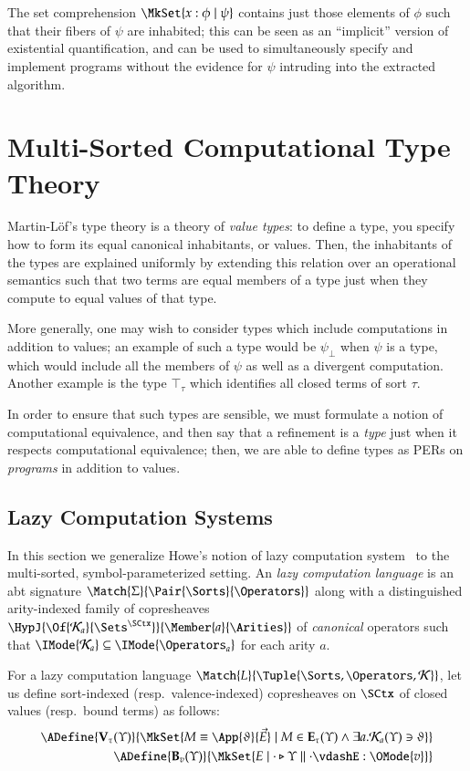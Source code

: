 \documentclass[11pt]{article}
\theoremstyle{definition}
\theoremstyle{notation}
\theoremstyle{remark}
\numberwithin{equation}{section}
\newcommand\IsSubsetEq[2]{\IMode{#1}\subseteq\IMode{#2}}
\newcommand\IsAbtUnmoded[5]{
  #1\triangleright%
  #2\parallel%
  #3\vdash%
  #4:\OMode{#5}%
}
\newcommand\TyTop[1]{\top_{#1}}
\newcommand\Exprs{\mathbf{E}}
\newcommand\Values{\mathbf{V}}
\newcommand\BExprs{\mathbf{B}}
\begin{document}
The set comprehension $\MkSet{x:\phi\mid\psi}$ contains just those elements of
$\phi$ such that their fibers of $\psi$ are inhabited; this can be seen as an
``implicit'' version of existential quantification, and can be used to
simultaneously specify and implement programs without the evidence for $\psi$
intruding into the extracted algorithm.

\section{Multi-Sorted Computational Type Theory}
\label{sec:ctt}

Martin-L\"of's type theory is a theory of \emph{value types}: to define a type,
you specify how to form its equal canonical inhabitants, or values. Then, the
inhabitants of the types are explained uniformly by extending this relation
over an operational semantics such that two terms are equal members of a
type just when they compute to equal values of that type.

More generally, one may wish to consider types which include computations in
addition to values; an example of such a type would be $\psi_\bot$ when $\psi$
is a type, which would include all the members of $\psi$ as well as a divergent
computation. Another example is the type $\TyTop{\tau}$ which identifies all
closed terms of sort $\tau$.

In order to ensure that such types are sensible, we must formulate a notion of
computational equivalence, and then say that a refinement is a \emph{type} just
when it respects computational equivalence; then, we are able to define types
as PERs on \emph{programs} in addition to values.


\subsection{Lazy Computation Systems}

In this section we generalize Howe's notion of lazy computation
system~\cite{howe:1989} to the multi-sorted, symbol-parameterized setting. An
\emph{lazy computation language} is an abt signature
$\Match{\Sigma}{\Pair{\Sorts}{\Operators}}$ along with a distinguished
arity-indexed family of copresheaves
$\HypJ{\Of{\CanOperators_a}{\Sets^\SCtx}}{\Member{a}{\Arities}}$ of
\emph{canonical} operators such that
$\IsSubsetEq{\CanOperators_a}{\Operators_a}$ for each arity $a$.

For a lazy computation language
$\Match{L}{\Tuple{\Sorts,\Operators,\CanOperators}}$, let us define
sort-indexed (resp.\ valence-indexed) copresheaves on $\SCtx$ of closed values
(resp.\ bound terms) as follows:
\begin{align*}
  \ADefine{\Values_\tau(\Upsilon)}{
    \MkSet{
      M\equiv\App{\vartheta}{\vec{E}}
      \mid M\in\Exprs_\tau(\Upsilon)\land \exists a. \CanOperators_a(\Upsilon)\ni\vartheta
    }
  }\\
  \ADefine{
    \BExprs_{v}(\Upsilon)
  }{
    \MkSet{E \mid \IsAbtUnmoded{\cdot}{\Upsilon}{\cdot}{E}{v}}
  }
\end{align*}
\end{document}
